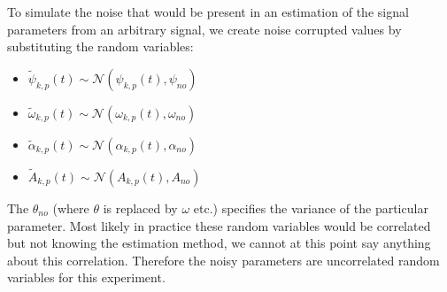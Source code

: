 To simulate the noise that would be present in an estimation of the signal
parameters from an arbitrary signal, we create noise corrupted values by
substituting the random variables:
\begin{itemize}
    \item
        $\tilde{\psi}_{k,p}(t) \sim
        \mathcal{N}(\psi_{k,p}(t),\psi_{no})$
    \item
        $\tilde{\omega}_{k,p}(t) \sim
        \mathcal{N}(\omega_{k,p}(t),\omega_{no})$
    \item
        $\tilde{\alpha}_{k,p}(t) \sim
        \mathcal{N}(\alpha_{k,p}(t),\alpha_{no})$
    \item
        $\tilde{A}_{k,p}(t) \sim
        \mathcal{N}(A_{k,p}(t),A_{no})$
\end{itemize}
The $\theta_{no}$ (where $\theta$ is replaced by $\omega$ etc.) specifies the
variance of the particular parameter. Most likely in practice these random
variables would be correlated but not knowing the estimation method, we cannot
at this point say anything about this correlation. Therefore the noisy
parameters are uncorrelated random variables for this experiment.

